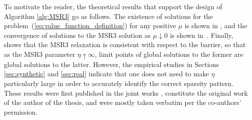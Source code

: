 To motivate the reader, the theoretical results that support the design of Algorithm \ref{alg:MSR3} go as follows. The existence of solutions for the problem~(\ref{eq:value_function_definition}) for any positive $\mu$ is shown in \cite[Theorem 5]{Theory1}, and the convergence of solutions to the MSR3 solution as $\mu\downarrow 0$ is shown in~\cite[Theorem 7]{Theory1}.  
Finally, \cite[Theorem 6]{Theory1} shows that the MSR3 relaxation is consistent with respect to the barrier, so that as the MSR3 parameter $\eta \uparrow \infty$,
 limit points of global solutions to the former are global solutions to the latter. 
 However, the empirical studies in Sections \ref{sec:synthetic} and \ref{sec:real}
 indicate that one does not need to make $\eta$ particularly large in order to accurately identify the correct sparsity pattern. These results were first published in the joint works \cite{sholokhov2022relaxation, aravkin2022jimtheory}, constitute the original work of the author of the thesis, and were mostly taken verbatim per the co-authors'  permission.





